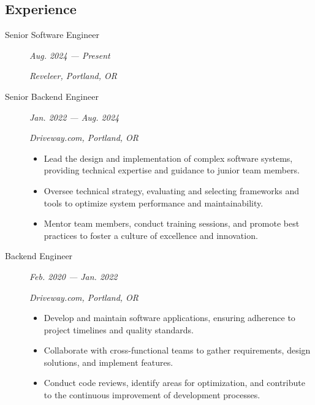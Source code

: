 \documentclass{article}
\def \intraspace {0.1em}
\begin{document}

\subsection*{Experience}

    \begin{description}
		
    \item[Senior Software Engineer] \hfill \textit{Aug. 2024 — Present}
    
        \textit{Reveleer, Portland, OR}
        \vspace{\intraspace}
		
	\item[Senior Backend Engineer] \hfill \textit{Jan. 2022 — Aug. 2024}
	
        \textit{Driveway.com, Portland, OR}
		\begin{itemize}
    	\item Lead the design and implementation of complex software systems, providing technical expertise and guidance to junior team members.
    	\item Oversee technical strategy, evaluating and selecting frameworks and tools to optimize system performance and maintainability.
    	\item Mentor team members, conduct training sessions, and promote best practices to foster a culture of excellence and innovation.	
		\end{itemize}
		\vspace{\intraspace}
	
	\item[Backend Engineer] \hfill \textit{Feb. 2020 — Jan. 2022}
		
        \textit{Driveway.com, Portland, OR}
        \begin{itemize}
		\item Develop and maintain software applications, ensuring adherence to project timelines and quality standards.
    	\item Collaborate with cross-functional teams to gather requirements, design solutions, and implement features.
    	\item Conduct code reviews, identify areas for optimization, and contribute to the continuous improvement of development processes.
        \end{itemize}
		\vspace{\intraspace}


\end{description}
\end{document}
